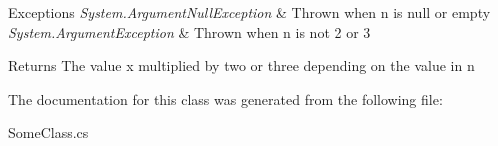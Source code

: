 \begin{DoxyExceptions}{Exceptions}
{\em System.\+Argument\+Null\+Exception} & Thrown when n is null or empty\\
\hline
{\em System.\+Argument\+Exception} & Thrown when n is not \textquotesingle{}2\textquotesingle{} or \textquotesingle{}3\textquotesingle{}\\
\hline
\end{DoxyExceptions}
\begin{DoxyReturn}{Returns}
The value x multiplied by two or three depending on the value in n
\end{DoxyReturn}


The documentation for this class was generated from the following file\+:\begin{DoxyCompactItemize}
\item 
Some\+Class.\+cs\end{DoxyCompactItemize}
